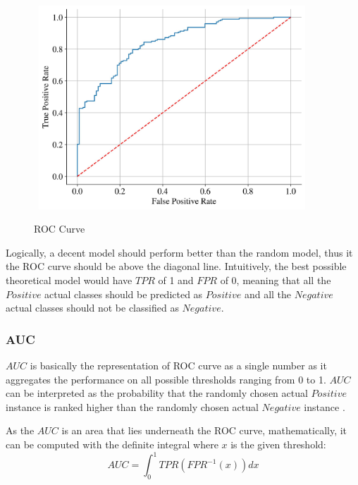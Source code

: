  \begin{figure}[H]
    \centering
    \caption{ROC Curve}\vspace{0.5em}
    \label{fig:roccurvetheory}\
    \includegraphics[width=100mm]{Figures/ROC_theory.jpg}

    \vspace{-1em}
\end{figure}

Logically, a decent model should perform better than the random model, thus it the ROC curve should be above the diagonal line.
Intuitively, the best possible theoretical model would have $TPR$ of 1 and $FPR$ of 0, meaning that all the $Positive$ actual classes should be predicted as $Positive$ and all the $Negative$ actual classes should not be classified as $Negative$.
 \newpage
\subsubsection{AUC}

$AUC$ is basically the representation of ROC curve as a single number as it aggregates the performance on all possible thresholds ranging from 0 to 1.
$AUC$ can be interpreted as the probability that the randomly chosen actual $Positive$ instance is ranked higher than the randomly chosen actual $Negative$ instance \citep{janitza2013auc}.

As the $AUC$ is an area that lies underneath the ROC curve, mathematically, it can be computed with the definite integral where $x$ is the given threshold:
\begin{equation}\label{eq}
    AUC = \int_{0}^{1} TPR \left(FPR^{-1}\left(x \right)\right) dx
\end{equation}


